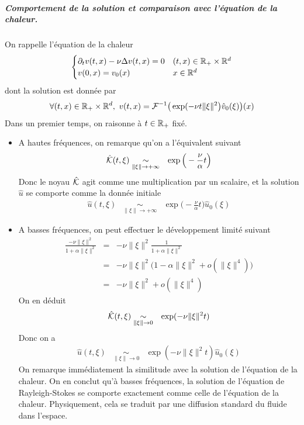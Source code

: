 \subparagraph{Comportement de la solution et comparaison avec l'équation de la chaleur.} On rappelle l'équation de la chaleur
\begin{equation*}
    \begin{cases}
        \partial_tv(t,x)-\nu\Delta v(t,x)=0 & (t,x) \in \mathbb{R}_+ \times \mathbb{R}^d \\
        v(0,x) = v_0(x) & x \in \mathbb{R}^d
    \end{cases}
\end{equation*}
dont la solution est donnée par 
\begin{equation*}
    \forall (t,x) \in \mathbb{R}_+ \times \mathbb{R}^d, \ v(t,x) = \mathcal{F}^{-1}\big(\exp(-\nu t\|\xi\|^2\big)\hat{v}_0(\xi)\big)(x)
\end{equation*}
Dans un premier temps, on raisonne à $t \in \mathbb{R}_+$ fixé.
\begin{itemize}
    \item A hautes fréquences, on remarque qu'on a l'équivalent suivant
    \begin{eqnarray*}
        \hat{\mathcal{K}}(t,\xi) &\underset{\|\xi\|\to+\infty}{\sim}& \exp\Big(-\frac{\nu}{\alpha}t\Big)
    \end{eqnarray*}
    Donc le noyau $\hat{\mathcal{K}}$ agit comme une multiplication par un scalaire, et la solution $\hat{u}$ se comporte comme la donnée initiale
    \begin{eqnarray*}
        \hat{u}(t,\xi) &\underset{\|\xi\|\to+\infty}{\sim}& \exp\Big(-\frac{\nu}{\alpha}t\Big)\hat{u}_0(\xi)
    \end{eqnarray*}
    \item A basses fréquences, on peut effectuer le développement limité suivant
    \begin{eqnarray*}
        \frac{-\nu\|\xi\|^2}{1+\alpha\|\xi\|^2} &=& -\nu\|\xi\|^2\frac{1}{1+\alpha \|\xi\|^2} \\ 
        &=& -\nu\|\xi\|^2\big(1-\alpha\|\xi\|^2+o(\|\xi\|^4)\big) \\
        &=& -\nu\|\xi\|^2+o(\|\xi\|^4)
    \end{eqnarray*}
    On en déduit
    \begin{eqnarray*}
        \hat{\mathcal{K}}(t,\xi) &\underset{\|\xi\|\to 0}{\sim}& \exp(-\nu\|\xi\|^2t)
    \end{eqnarray*}
    Donc on a 
    \begin{eqnarray*}
        \hat{u}(t,\xi) &\underset{\|\xi\|\to 0}{\sim}& \exp(-\nu\|\xi\|^2t)\hat{u}_0(\xi)
    \end{eqnarray*}
    On remarque immédiatement la similitude avec la solution de l'équation de la chaleur. On en conclut qu'à basses fréquences, la solution de l'équation de Rayleigh-Stokes se comporte exactement comme celle de l'équation de la chaleur. Physiquement, cela se traduit par une diffusion standard du fluide dans l'espace.
\end{itemize}
